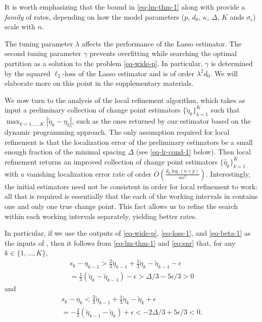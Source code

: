 \documentclass[twoside]{article}
\begin{document}
	It is worth emphasizing that the bound in \eqref{eq-lm-thm-1} along with    provide a {\it family} of rates, depending on how the model parameters ($p$, $d_0$, $\kappa$, $\Delta$, $K$ ands $\sigma_{\epsilon}$) scale with $n$.
	
The tuning parameter $\lambda$ affects the performance of the Lasso estimator.  The second tuning parameter $\gamma$ prevents overfitting while searching the optimal partition as a solution to the problem \eqref{eq-wide-p}.  In particular, $\gamma$ is determined by the squared $\ell_2$-loss of the Lasso estimator and is of order $\lambda^2 d_0$.  We will elaborate more on this point in the supplementary materials.	
	
We now turn to the analysis of the local refinement algorithm, which takes as input a preliminary collection of change point estimators $\{\widetilde{\eta}_k\}_{k = 1}^{K}$ such that $\max_{k = 1, \ldots, K} |\widetilde{\eta}_k - \eta_k| $, such as the ones returned by our estimator based on the dynamic programming approach. The only assumption required for local refinement  is that the localization error of  the preliminary estimators be a small enough fraction of the minimal spacing $\Delta$ (see \eqref{eq-lr-cond-1} below). Then local refinement returns an improved collection of change point estimators $\{\widehat{\eta}_k\}_{k = 1}^{K}$ with a vanishing localization error rate of order $O \left( \frac{d_0 \log ( n \vee p )}{n \kappa^2} \right)$. Interestingly, the initial estimators need not be consistent in order for local refinement to work: all that is required is essentially that the each of the working intervals in  contains one and only one true change point. This fact allows us to refine the search within each working intervals separately, yielding better rates. 

In particular, if we use the outputs of \eqref{eq-wide-p}, \eqref{eq-loss-1}, and \eqref{eq-beta-1} as the inputs of , then it follows from \eqref{eq-lm-thm-1} and \eqref{eq:snr} that, for any $k \in \{1, \ldots, K\}$, 
	\begin{align*}
		s_k - \eta_{k - 1} > \frac{2}{3}\widetilde{\eta}_{k - 1} + \frac{1}{3}\widetilde{\eta}_{k} - \widetilde{\eta}_{k - 1} - \epsilon \\
		= \frac{1}{3}(\widetilde{\eta}_k - \widetilde{\eta}_{k-1}) - \epsilon > \Delta/3 - 5\epsilon/3 > 0
	\end{align*}
	and
	\begin{align*}
		s_k - \eta_{k} < \frac{2}{3}\widetilde{\eta}_{k - 1} + \frac{1}{3}\widetilde{\eta}_{k} - \widetilde{\eta}_{k} + \epsilon \\
		= - \frac{2}{3}(\widetilde{\eta}_{k-1} - \widetilde{\eta}_{k}) + \epsilon < -2\Delta/3 + 5\epsilon/3 < 0.
	\end{align*}
\end{document}
